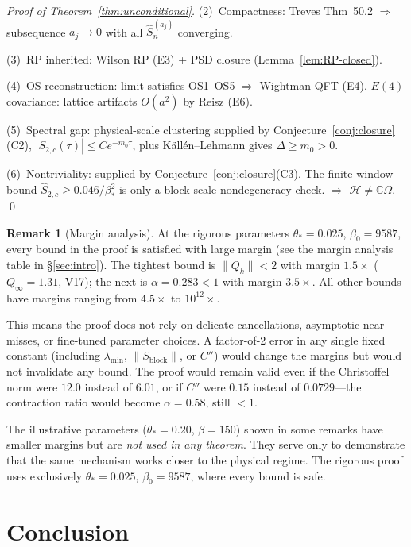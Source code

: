 \documentclass[11pt]{article}
\theoremstyle{definition}
\newtheorem{remark}[theorem]{Remark}
\begin{document}
\begin{proof}[Proof of Theorem~\ref{thm:unconditional}]
(2)~Compactness: Treves Thm~50.2 $\Rightarrow$ subsequence
$a_j\to 0$ with all $\hat S_n^{(a_j)}$ converging.

(3)~RP inherited: Wilson RP (E3) + PSD closure
(Lemma~\ref{lem:RP-closed}).

(4)~OS reconstruction: limit satisfies OS1--OS5
$\Rightarrow$ Wightman QFT (E4).
$E(4)$ covariance: lattice artifacts $O(a^2)$ by Reisz (E6).

(5)~Spectral gap: physical-scale clustering supplied by Conjecture~\ref{conj:closure}(C2), $|S_{2,c}(\tau)|\le Ce^{-m_0\tau}$, plus K\"all\'en--Lehmann gives $\Delta\ge m_0>0$.

(6)~Nontriviality: supplied by Conjecture~\ref{conj:closure}(C3).  The finite-window bound $\hat S_{2,c}\ge 0.046/\beta_*^2$ is only a block-scale nondegeneracy check.
$\Rightarrow$ $\mathcal{H}\ne\mathbb{C}\Omega$.
\qed
\end{proof}

\begin{remark}[Margin analysis]%
\label{rem:safe-regime}
At the rigorous parameters $\theta_*=0.025$, $\beta_0=9587$,
every bound in the proof is satisfied with large margin
(see the margin analysis table in \S\ref{sec:intro}).
The tightest bound is $\|Q_k\|<2$ with margin
$1.5\times$ ($Q_\infty=1.31$, V17);
the next is $\alpha=0.283<1$ with margin $3.5\times$.
All other bounds have margins ranging from $4.5\times$ to
$10^{12}\times$.

This means the proof does not rely on delicate cancellations,
asymptotic near-misses, or fine-tuned parameter choices.
A factor-of-2 error in any single fixed constant
(including $\lambda_{\min}$, $\|S_{\mathrm{block}}\|$, or $C''$)
would change the margins but would not invalidate any bound.
The proof would remain valid even if the Christoffel norm
were $12.0$ instead of $6.01$, or if $C''$ were $0.15$
instead of $0.0729$---the contraction ratio would become
$\alpha=0.58$, still $<1$.

The illustrative parameters ($\theta_*=0.20$, $\beta=150$)
shown in some remarks have smaller margins but are \emph{not
used in any theorem}.  They serve only to demonstrate that
the same mechanism works closer to the physical regime.
The rigorous proof uses exclusively $\theta_*=0.025$,
$\beta_0=9587$, where every bound is safe.
\end{remark}


\section{Conclusion}\label{sec:conclusion}
\end{document}
